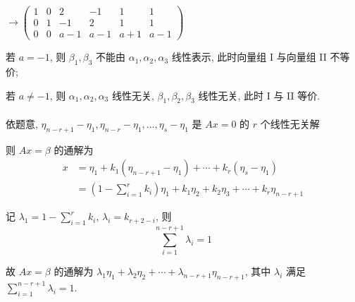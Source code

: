 		 \( \rightarrow \begin{pmatrix}
			 1 & 0 & 2   & -1  & 1   & 1   \\
			 0 & 1 & -1  & 2   & 1   & 1   \\
			 0 & 0 & a-1 & a-1 & a+1 & a-1
		 \end{pmatrix} \)

		 若 \( a = -1 \), 则 \( \beta_{1}, \beta_{3} \) 不能由 \( \alpha_{1}, \alpha_{2}, \alpha_{3} \) 线性表示, 此时向量组 I 与向量组 II 不等价;

		 若 \( a \neq -1 \), 则 \( \alpha_{1}, \alpha_{2}, \alpha_{3} \) 线性无关, \( \beta_{1}, \beta_{2}, \beta_{3} \) 线性无关, 此时 I 与 II 等价.


	 \paragraph{} %
		 依题意, \( \eta_{n-r+1}-\eta_{1}, \eta_{n-r}-\eta_{1}, \dots, \eta_{s}-\eta_{1} \) 是 \( Ax=0 \) 的 \( r \) 个线性无关解

		 则 \( Ax=\beta \) 的通解为
		 \begin{align*}
			 x & = \eta_{1} + k_{1}(\eta_{n-r+1} - \eta_{1}) + \cdots + k_{r}(\eta_{s} - \eta_{1})                            \\
			   & = \left(1 - \sum_{i=1}^{r} k_{i}\right)\eta_{1} + k_{1}\eta_{2} + k_{2}\eta_{3} + \cdots + k_{r}\eta_{n-r+1}
		 \end{align*}

		 记 \( \lambda_{1} = 1-\sum_{i=1}^{r}k_{i} \), \( \lambda_i=k_{r+2-i} \), 则
		 \[ \sum_{i=1}^{n-r+1}\lambda_{i} = 1 \]

		 故 \( Ax=\beta \) 的通解为 \( \lambda_{1}\eta_{1} + \lambda_{2}\eta_{2} + \cdots + \lambda_{n-r+1}\eta_{n-r+1} \), 其中 \( \lambda_{i} \) 满足 \( \sum_{i=1}^{n-r+1}\lambda_{i} = 1 \).
